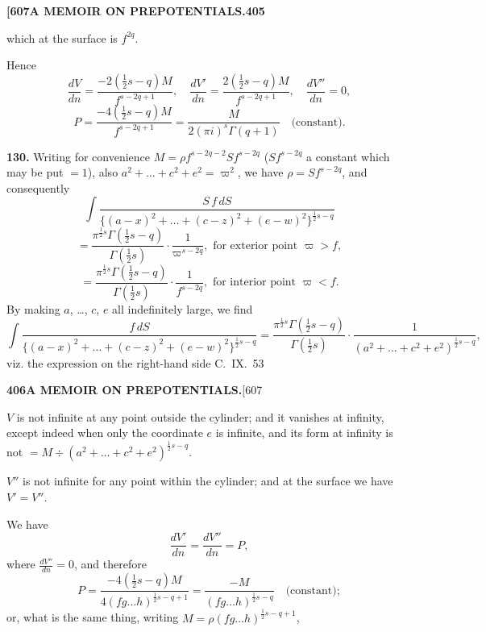 \documentclass[11pt,a4paper]{article}
\begin{document}
{\newpage
\noindent\textbf{[607}\hspace{\fill}\textbf{A MEMOIR ON PREPOTENTIALS.}\hspace{\fill}\textbf{405}

which at the surface is $f^{2q}$.

Hence
\[
\frac{dV}{dn} = \frac{-2(\frac{1}{2}s-q)M}{f^{s-2q+1}},\quad \frac{dV'}{dn} = \frac{2(\frac{1}{2}s-q)M}{f^{s-2q+1}},\quad \frac{dV''}{dn} = 0,
\]
\[
P = \frac{-4(\frac{1}{2}s-q)M}{f^{s-2q+1}} = \frac{M}{2(\pi i)^s \Gamma(q+1)} \quad \text{(constant)}.
\]

\medskip
\noindent\textbf{130.}
Writing for convenience $M = \rho f^{s-2q-2} Sf^{s-2q}$ ($Sf^{s-2q}$ a constant which may be put $= 1$), also $a^2 + \ldots + c^2 + e^2 = \varpi^2$, we have $\rho = Sf^{s-2q}$, and consequently
\[
\int \frac{S\, f\, dS}{\{(a-x)^2 + \ldots + (c-z)^2 + (e-w)^2\}^{\frac{1}{2}s-q}}
\]
\[
= \frac{\pi^{\frac{1}{2}s}\Gamma(\frac{1}{2}s-q)}{\Gamma(\frac{1}{2}s)} \cdot \frac{1}{\varpi^{s-2q}}, \text{ for exterior point } \varpi > f,
\]
\[
= \frac{\pi^{\frac{1}{2}s}\Gamma(\frac{1}{2}s-q)}{\Gamma(\frac{1}{2}s)} \cdot \frac{1}{f^{s-2q}}, \text{ for interior point } \varpi < f.
\]
By making $a$, \ldots, $c$, $e$ all indefinitely large, we find
\[
\int \frac{f\,dS}{\{(a-x)^2 + \ldots + (c-z)^2 + (e-w)^2\}^{\frac{1}{2}s-q}} = \frac{\pi^{\frac{1}{2}s}\Gamma(\frac{1}{2}s-q)}{\Gamma(\frac{1}{2}s)} \cdot \frac{1}{(a^2 + \ldots + c^2 + e^2)^{\frac{1}{2}s-q}},
\]
viz. the expression on the right-hand side
\hfill C.~IX.\ 53

\newpage
\noindent\textbf{406}\hspace{\fill}\textbf{A MEMOIR ON PREPOTENTIALS.}\hspace{\fill}[607

$V$ is not infinite at any point outside the cylinder; and it vanishes at infinity, except indeed when only the coordinate $e$ is infinite, and its form at infinity is not $= M \div (a^2 + \ldots + c^2 + e^2)^{\frac{1}{2}s-q}$.

$V''$ is not infinite for any point within the cylinder; and at the surface we have $V' = V''$.

We have
\[
\frac{dV'}{dn} = \frac{dV''}{dn} = P,
\]
where $\frac{dV''}{dn} = 0$, and therefore
\[
P = \frac{-4(\frac{1}{2}s-q)M}{4(fg\ldots h)^{\frac{1}{2}s-q+1}} = \frac{-M}{(fg\ldots h)^{\frac{1}{2}s-q}} \quad \text{(constant)};
\]
or, what is the same thing, writing $M = \rho (fg\ldots h)^{\frac{1}{2}s-q+1}$,

}
\end{document}
